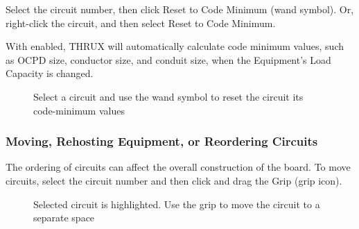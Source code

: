 \documentclass[letterpaper,10pt,english]{sphinxmanual}
\begin{document}
Select the circuit number, then click Reset to Code Minimum (wand symbol).  Or, right-click the circuit, and then select Reset to Code Minimum.

With {\hyperref[\detokenize{docs/userguide/explorersandutilitytools/statusbar/index-status_bar:design-assistance}]{}} enabled, THRUX will automatically calculate code minimum values, such as OCPD size, conductor size, and conduit size, when the Equipment’s Load Capacity is changed.

\begin{figure}[H]
\centering
\capstart

\noindent{}
\caption{Select a circuit and use the wand symbol to reset the circuit its code-minimum values}\label{\detokenize{docs/userguide/buildingelectricalmodel/schedules/index-schedules:id10}}\end{figure}

\ignorespaces {}\label{\detokenize{docs/userguide/buildingelectricalmodel/schedules/index-schedules:schedules-rehosting}}
\ignorespaces 

\subsubsection{Moving, Rehosting Equipment, or Reordering Circuits}
\label{\detokenize{docs/userguide/buildingelectricalmodel/schedules/index-schedules:moving-rehosting-equipment-or-reordering-circuits}}\label{\detokenize{docs/userguide/buildingelectricalmodel/schedules/index-schedules:index-4}}
The ordering of circuits can affect the overall construction of the board.  To move circuits, select the circuit number and then click and drag the Grip (grip icon).

\begin{figure}[H]
\centering
\capstart

\noindent{}
\caption{Selected circuit is highlighted.  Use the grip to move the circuit to a separate space}\label{\detokenize{docs/userguide/buildingelectricalmodel/schedules/index-schedules:id11}}\end{figure}
\end{document}
